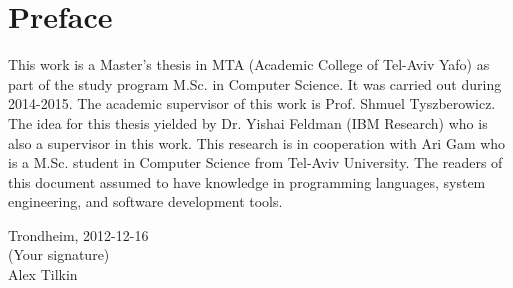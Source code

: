 \section*{Preface}
This work is a Master's thesis in MTA (Academic College of Tel-Aviv Yafo) as part of the study program M.Sc. in Computer Science. It was carried out during 2014-2015. The academic supervisor of this work is Prof. Shmuel Tyszberowicz. The idea for this thesis yielded by Dr. Yishai Feldman (IBM Research) who is also a supervisor in this work. This research is in cooperation with Ari Gam who is a M.Sc. student in Computer Science from Tel-Aviv University. The readers of this document assumed to have knowledge in programming languages, system engineering, and software development tools.\\[2cm]

\begin{center}
Trondheim, 2012-12-16\\[1pc]
(Your signature)\\[1pc]
Alex Tilkin
\end{center}